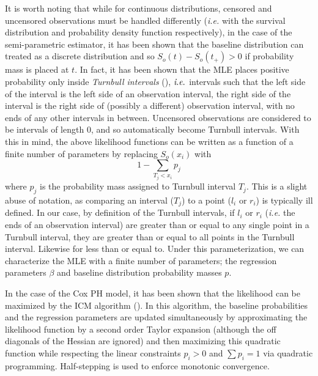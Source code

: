 \documentclass[article]{jss}
\begin{document}
	 It is worth noting that while for continuous distributions, censored and uncensored observations must be handled differently (\emph{i.e.} with the survival distribution and probability density function respectively), in the case of the semi-parametric estimator, it has been shown that the baseline distribution can treated as a discrete distribution and so $S_o(t) - S_o(t_+) > 0$ if probability mass is placed at $t$. In fact, it has been shown that the MLE places positive probability only inside \emph{Turnbull intervals} (\cite{Turnbull_1976}), $\emph{i.e.}$ intervals such that the left side of the interval is the left side of an observation interval, the right side of the interval is the right side of (possibly a different) observation interval, with no ends of any other intervals in between. Uncensored observations are considered to be intervals of length 0, and so automatically become Turnbull intervals. With this in mind, the above likelihood functions can be written as a function of a finite number of parameters by replacing $	S_o(x_i)  $
with  
\[
1 - \displaystyle \sum_{T_j < x_i} p_j 
\]	 
	 where $p_j$ is the probability mass assigned to Turnbull interval $T_j$. This is a slight abuse of notation, as comparing an interval ($T_j$) to a point ($l_i$ or $r_i$) is typically ill defined. In our case, by definition of the Turnbull intervals, if $l_i$ or $r_i$ (\emph{i.e.} the ends of an observation interval) are greater than or equal to any single point in a Turnbull interval, they are greater than or equal to all points in the Turnbull interval. Likewise for less than or equal to. Under this parameterization, we can characterize the MLE with a finite number of parameters; the regression parameters $\beta$ and baseline distribution probability masses $p$. 

	In the case of the Cox PH model, it has been shown that the likelihood can be maximized by the ICM algorithm (\cite{coxphICM}). In this algorithm, the baseline probabilities and the regression parameters are updated simultaneously by approximating the likelihood function by a second order Taylor expansion (although the off diagonals of the Hessian are ignored) and then maximizing this quadratic function while respecting the linear constraints $p_i > 0$ and $\sum p_i = 1$ via quadratic programming. Half-stepping is used to enforce monotonic convergence.
	
\end{document}
